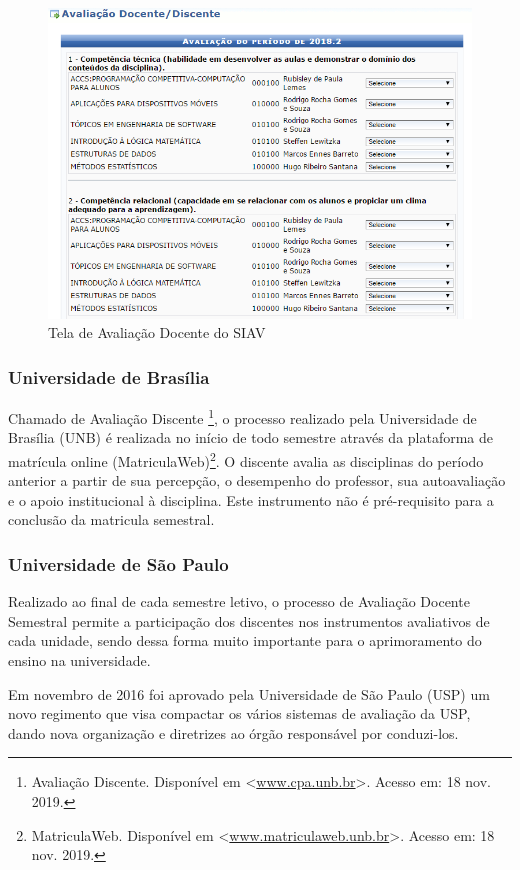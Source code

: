 \documentclass[12pt, a4paper]{report}
\begin{document}
\begin{figure}
\centering
\includegraphics[scale=0.6]{siav_avaliacao.png}
\caption{Tela de Avaliação Docente do SIAV}
\label{fig:siav_avalia}
\end{figure}

\subsubsection{Universidade de Brasília}
Chamado de Avaliação Discente \footnote{Avaliação Discente. Disponível em <\url{www.cpa.unb.br}>. Acesso em: 18 nov. 2019.}, o processo realizado pela Universidade de Brasília (UNB) é realizada no início de todo semestre através da plataforma de matrícula online (MatriculaWeb)\footnote{MatriculaWeb. Disponível em <\url{www.matriculaweb.unb.br}>. Acesso em: 18 nov. 2019.}. O discente avalia as disciplinas do período anterior a partir de sua percepção, o desempenho do professor, sua autoavaliação e o apoio institucional à disciplina. Este instrumento não é pré-requisito para a conclusão da matricula semestral.
 
\subsubsection{Universidade de São Paulo}

Realizado ao final de cada semestre letivo, o processo de Avaliação Docente Semestral permite a participação dos discentes nos instrumentos avaliativos de cada unidade, sendo dessa forma muito importante para o aprimoramento do ensino na universidade.

Em novembro de 2016 foi aprovado pela Universidade de São Paulo (USP) um novo regimento que visa compactar os vários sistemas de avaliação da USP, dando nova organização e diretrizes ao órgão responsável por conduzi-los.
\end{document}
